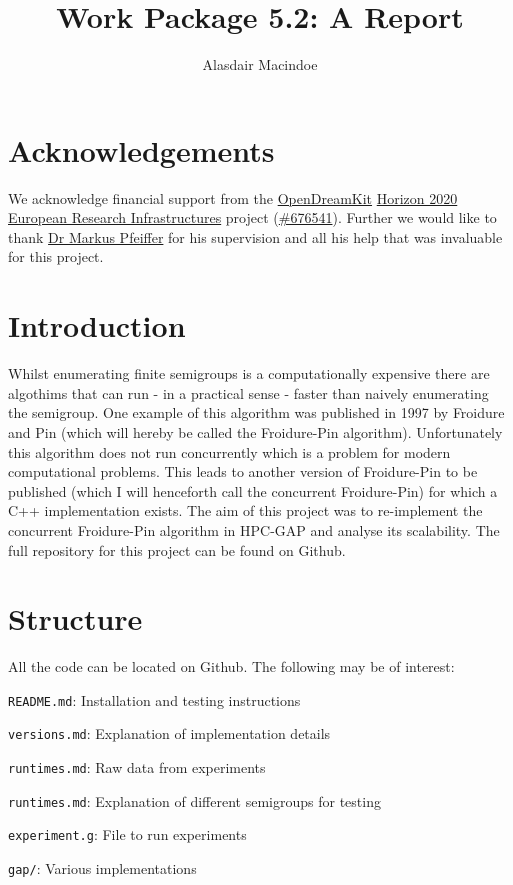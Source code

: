 \documentclass{report}
\author{Alasdair Macindoe}
\date{}
\title{Work Package 5.2: A Report}
\begin{document}
\maketitle

\section*{Acknowledgements}
We acknowledge financial support from the \href{http://opendreamkit.org/}{OpenDreamKit} \href{https://ec.europa.eu/programmes/horizon2020/}{Horizon 2020}
\href{https://ec.europa.eu/programmes/horizon2020/en/h2020-section/european-research-infrastructures-including-e-infrastructures}{European Research Infrastructures}
project (\href{http://cordis.europa.eu/project/rcn/198334_en.html}{\#676541}).
Further we would like to thank \href{https://www.cs.st-andrews.ac.uk/directory/person?id=mp397}{Dr Markus Pfeiffer} for his supervision and all his help
that was invaluable for this project.

\section*{Introduction}
Whilst enumerating finite semigroups is a computationally expensive there are algothims that can run - in a practical sense - faster than naively enumerating
the semigroup. One example of this algorithm was published in 1997 by Froidure and Pin\cite{fpin} (which will hereby be called the Froidure-Pin algorithm).
Unfortunately this algorithm does not run concurrently which is a problem for modern computational problems. This leads to another version of Froidure-Pin to be
published\cite{cfp} (which I will henceforth call the concurrent Froidure-Pin) for which a C++ implementation exists\cite{cfpcpp}.
\newline
\newline
The aim of this project was to re-implement the concurrent Froidure-Pin algorithm in HPC-GAP\cite{GAP4} and analyse its scalability.
The full repository for this project can be found on Github\cite{project}.

\section*{Structure}
All the code can be located on Github\cite{project}. The following may be of interest:
\newline
\begin{description}
\item \texttt{README.md}: Installation and testing instructions
\item \texttt{versions.md}: Explanation of implementation details
\item \texttt{runtimes.md}: Raw data from experiments
\item \texttt{runtimes.md}: Explanation of different semigroups for testing
\item \texttt{experiment.g}: File to run experiments
\item \texttt{gap/}: Various implementations
\end{description}
\end{document}

